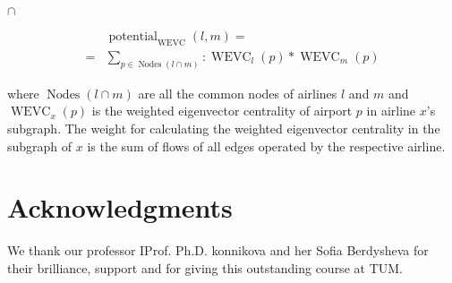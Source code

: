 \documentclass[twocolumn]{tum-article}
\DeclareMathOperator{\Potential}{potential}
\DeclareMathOperator{\WEVC}{WEVC}
\DeclareMathOperator{\Nodes}{Nodes}
\begin{document}
$\cap$

\begin{equation}
\begin{aligned}
& \Potential_{\WEVC}(l, m) = \\
 = & \sum_{p \in \Nodes(l \cap m)}: \WEVC_{l}(p) * \WEVC_{m}(p)
\end{aligned}
\end{equation}

where $\Nodes(l \cap m)$ are all the common nodes of airlines $l$ and $m$ and $\WEVC_{x}(p)$ is the weighted eigenvector centrality of airport $p$ in airline $x$'s subgraph. 
The weight for calculating the weighted eigenvector centrality in the subgraph of $x$ is the sum of flows of all edges operated by the respective airline. 

\section*{Acknowledgments}
We thank our professor IProf. Ph.D. konnikova and her Sofia Berdysheva for their brilliance, support and for giving this outstanding course at TUM.



\end{document}
